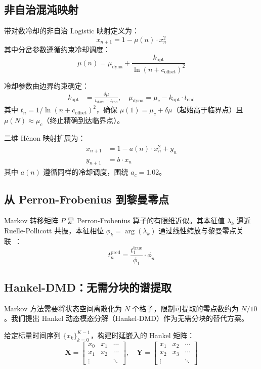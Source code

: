 \documentclass[twocolumn]{article}
\begin{document}
\subsection{非自治混沌映射}

带对数冷却的非自治 Logistic 映射定义为：
\begin{equation}
x_{n+1} = 1 - \mu(n) \cdot x_n^2
\end{equation}
其中分岔参数遵循约束冷却调度：
\begin{equation}
\mu(n) = \mu_{\text{dyna}} + \frac{k_{\text{opt}}}{\ln(n + c_{\text{offset}})^2}
\label{eq:cooling}
\end{equation}

冷却参数由边界约束确定：
\begin{align}
k_{\text{opt}} &= \frac{\delta\mu}{t_{\text{start}} - t_{\text{end}}}, \quad
\mu_{\text{dyna}} = \mu_c - k_{\text{opt}} \cdot t_{\text{end}}
\end{align}
其中 $t_n = 1/\ln(n + c_{\text{offset}})^2$，确保 $\mu(1) = \mu_c + \delta\mu$（起始高于临界点）且 $\mu(N) \approx \mu_c$（终止精确到达临界点）。

二维 H\'enon 映射扩展为：
\begin{align}
x_{n+1} &= 1 - a(n) \cdot x_n^2 + y_n \\
y_{n+1} &= b \cdot x_n
\end{align}
其中 $a(n)$ 遵循同样的冷却调度，围绕 $a_c = 1.02$。

\subsection{从 Perron-Frobenius 到黎曼零点}

Markov 转移矩阵 $P$ 是 Perron-Frobenius 算子的有限维近似。其本征值 $\lambda_k$ 逼近 Ruelle-Pollicott 共振，本征相位 $\phi_k = \arg(\lambda_k)$ 通过线性缩放与黎曼零点关联~\cite{wang2026logistic}：
\begin{equation}
t_n^{\text{pred}} = \frac{t_1^{\text{true}}}{\phi_1} \cdot \phi_n
\end{equation}

\subsection{Hankel-DMD：无需分块的谱提取}

Markov 方法需要将状态空间离散化为 $N$ 个格子，限制可提取的零点数约为 $N/10$。我们提出 Hankel 动态模态分解（Hankel-DMD）作为无需分块的替代方案。

给定标量时间序列 $\{x_k\}_{k=0}^{K-1}$，构建时延嵌入的 Hankel 矩阵：
\begin{equation}
\mathbf{X} = \begin{bmatrix} x_0 & x_1 & \cdots \\ x_1 & x_2 & \cdots \\ \vdots & & \ddots \end{bmatrix}, \quad
\mathbf{Y} = \begin{bmatrix} x_1 & x_2 & \cdots \\ x_2 & x_3 & \cdots \\ \vdots & & \ddots \end{bmatrix}
\end{equation}
\end{document}
